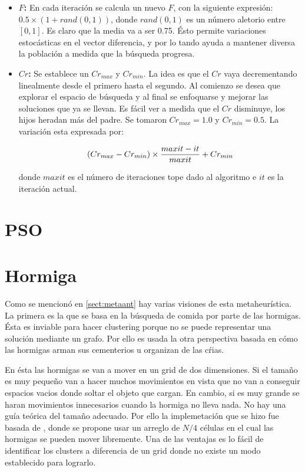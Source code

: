 \begin{itemize}

\item {\bf $F$:} En cada iteraci\'on se calcula un nuevo $F$, con la siguiente expresi\'on:
$0.5 \times (1 + rand(0,1))$, donde $rand(0,1)$ es un n\'umero aletorio entre $[0,1]$.
Es claro que la media va a ser 0.75. \'Esto permite variaciones estoc\'asticas en el vector diferencia, y
por lo tando ayuda a mantener diversa la poblaci\'on a medida que la b\'usqueda progresa.

\item {\bf $Cr$:} Se establece un $Cr_{max}$ y $Cr_{min}$. La idea es que el $Cr$ vaya
decrementando linealmente desde el primero hasta el segundo. Al comienzo
se desea que explorar el espacio de b\'usqueda y al final se enfoquarse y mejorar las soluciones
que ya se llevan. Es f\'acil ver a medida que el $Cr$ disminuye, los hijos heradan m\'as
del padre. Se tomaron $Cr_{max} = 1.0$ y $Cr_{min} = 0.5$. La variaci\'on esta expresada por:

\[
(Cr_{max}-Cr_{min}) \times {{maxit - it} \over maxit} + Cr_{min}
\]

donde $maxit$ es el n\'umero de iteraciones tope dado al algoritmo e $it$ es la iteraci\'on actual.

\end{itemize}

\section{PSO}  \label{chap:ipso}

\section{Hormiga}  \label{chap:ihormiga}

Como se mencion\'o en \ref{sect:metaant} hay varias visiones de esta metaheur\'istica.
La primera es la que se basa en la b\'usqueda de comida por parte de las hormigas.
\'Esta es inviable para hacer clustering porque no se puede representar 
una soluci\'on mediante un grafo. Por ello es usada la otra perspectiva basada en c\'omo
las hormigas arman sus cementerios u organizan de las c\'rias. 

En \'esta las hormigas se van a mover en un grid de dos dimensiones. Si 
el tama\~no es muy peque\~no van a hacer muchos movimientos en vista que
no van a conseguir espacios vacios donde soltar el objeto que cargan. En cambio,
si es muy grande se haran movimientos innecesarios cuando la hormiga no lleva nada.
No hay una gu\'ia te\'orica del tama\~no adecuado. Por ello la implemetaci\'on que
se hizo fue basada de \cite{OuBa2007}, donde se propone usar un arreglo 
de $N/4$ c\'elulas en el cual las hormigas se pueden mover libremente.
Una de las ventajas es lo f\'acil de identificar los clusters a diferencia
de un grid donde no existe un modo establecido para lograrlo.

